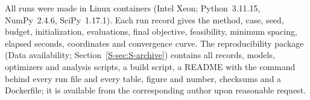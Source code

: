 
All runs were made in Linux containers (Intel Xeon; Python~3.11.15, NumPy~2.4.6, SciPy~1.17.1). Each run record gives the method, case, seed, budget, initialization, evaluations, final objective, feasibility, minimum spacing, elapsed seconds, coordinates and convergence curve. The reproducibility package (Data availability; Section~\ref{S-sec:S-archive}) contains all records, models, optimizers and analysis scripts, a build script, a README with the command behind every run file and every table, figure and number, checksums and a Dockerfile; it is available from the corresponding author upon reasonable request.

